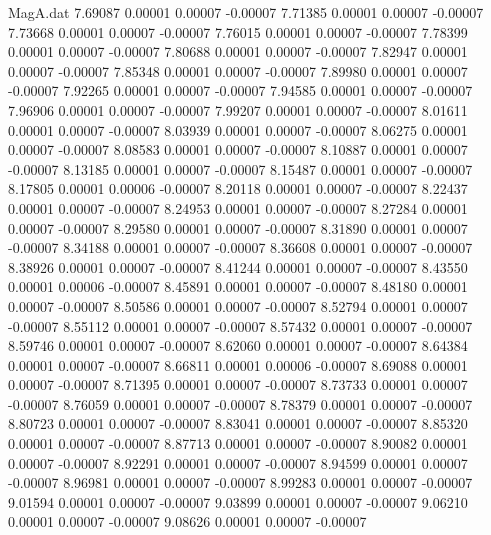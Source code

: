 \begin{filecontents}{MagA.dat}
   7.69087    0.00001    0.00007   -0.00007
   7.71385    0.00001    0.00007   -0.00007
   7.73668    0.00001    0.00007   -0.00007
   7.76015    0.00001    0.00007   -0.00007
   7.78399    0.00001    0.00007   -0.00007
   7.80688    0.00001    0.00007   -0.00007
   7.82947    0.00001    0.00007   -0.00007
   7.85348    0.00001    0.00007   -0.00007
   7.89980    0.00001    0.00007   -0.00007
   7.92265    0.00001    0.00007   -0.00007
   7.94585    0.00001    0.00007   -0.00007
   7.96906    0.00001    0.00007   -0.00007
   7.99207    0.00001    0.00007   -0.00007
   8.01611    0.00001    0.00007   -0.00007
   8.03939    0.00001    0.00007   -0.00007
   8.06275    0.00001    0.00007   -0.00007
   8.08583    0.00001    0.00007   -0.00007
   8.10887    0.00001    0.00007   -0.00007
   8.13185    0.00001    0.00007   -0.00007
   8.15487    0.00001    0.00007   -0.00007
   8.17805    0.00001    0.00006   -0.00007
   8.20118    0.00001    0.00007   -0.00007
   8.22437    0.00001    0.00007   -0.00007
   8.24953    0.00001    0.00007   -0.00007
   8.27284    0.00001    0.00007   -0.00007
   8.29580    0.00001    0.00007   -0.00007
   8.31890    0.00001    0.00007   -0.00007
   8.34188    0.00001    0.00007   -0.00007
   8.36608    0.00001    0.00007   -0.00007
   8.38926    0.00001    0.00007   -0.00007
   8.41244    0.00001    0.00007   -0.00007
   8.43550    0.00001    0.00006   -0.00007
   8.45891    0.00001    0.00007   -0.00007
   8.48180    0.00001    0.00007   -0.00007
   8.50586    0.00001    0.00007   -0.00007
   8.52794    0.00001    0.00007   -0.00007
   8.55112    0.00001    0.00007   -0.00007
   8.57432    0.00001    0.00007   -0.00007
   8.59746    0.00001    0.00007   -0.00007
   8.62060    0.00001    0.00007   -0.00007
   8.64384    0.00001    0.00007   -0.00007
   8.66811    0.00001    0.00006   -0.00007
   8.69088    0.00001    0.00007   -0.00007
   8.71395    0.00001    0.00007   -0.00007
   8.73733    0.00001    0.00007   -0.00007
   8.76059    0.00001    0.00007   -0.00007
   8.78379    0.00001    0.00007   -0.00007
   8.80723    0.00001    0.00007   -0.00007
   8.83041    0.00001    0.00007   -0.00007
   8.85320    0.00001    0.00007   -0.00007
   8.87713    0.00001    0.00007   -0.00007
   8.90082    0.00001    0.00007   -0.00007
   8.92291    0.00001    0.00007   -0.00007
   8.94599    0.00001    0.00007   -0.00007
   8.96981    0.00001    0.00007   -0.00007
   8.99283    0.00001    0.00007   -0.00007
   9.01594    0.00001    0.00007   -0.00007
   9.03899    0.00001    0.00007   -0.00007
   9.06210    0.00001    0.00007   -0.00007
   9.08626    0.00001    0.00007   -0.00007

\end{filecontents}
